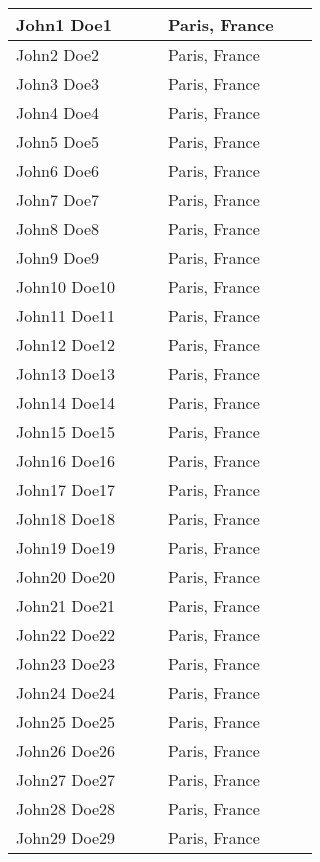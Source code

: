 
\begin{center}
\begin{longtable}{p{0.4\linewidth} p{0.4\linewidth} }
\hline
		John1 Doe1 & Paris, France \\ \hline
		John2 Doe2 & Paris, France \\ \hline
		John3 Doe3 & Paris, France \\ \hline
		John4 Doe4 & Paris, France \\ \hline
		John5 Doe5 & Paris, France \\ \hline
		John6 Doe6 & Paris, France \\ \hline
		John7 Doe7 & Paris, France \\ \hline
		John8 Doe8 & Paris, France \\ \hline
		John9 Doe9 & Paris, France \\ \hline
		John10 Doe10 & Paris, France \\ \hline
		John11 Doe11 & Paris, France \\ \hline
		John12 Doe12 & Paris, France \\ \hline
		John13 Doe13 & Paris, France \\ \hline
		John14 Doe14 & Paris, France \\ \hline
		John15 Doe15 & Paris, France \\ \hline
		John16 Doe16 & Paris, France \\ \hline
		John17 Doe17 & Paris, France \\ \hline
		John18 Doe18 & Paris, France \\ \hline
		John19 Doe19 & Paris, France \\ \hline
		John20 Doe20 & Paris, France \\ \hline
		John21 Doe21 & Paris, France \\ \hline
		John22 Doe22 & Paris, France \\ \hline
		John23 Doe23 & Paris, France \\ \hline
		John24 Doe24 & Paris, France \\ \hline
		John25 Doe25 & Paris, France \\ \hline
		John26 Doe26 & Paris, France \\ \hline
		John27 Doe27 & Paris, France \\ \hline
		John28 Doe28 & Paris, France \\ \hline
		John29 Doe29 & Paris, France \\ \hline
\end{longtable}
\end{center}
